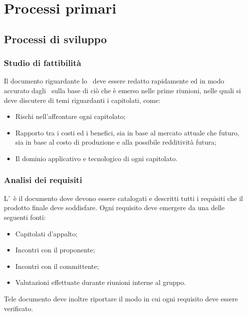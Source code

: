 \documentclass[../NormeProgetto.tex]{subfiles}
\begin{document}
\section{Processi primari}
	\subsection{Processi di sviluppo}
		\subsubsection{Studio di fattibilità}
		Il documento riguardante lo \studiodifattibilita\ deve essere redatto rapidamente ed in modo accurato dagli \analisti\ sulla base di ciò che è emerso nelle prime riunioni, nelle quali si deve discutere di temi riguardanti i capitolati, come:
		\begin{itemize}
			\item Rischi nell'affrontare ogni capitolato;
			\item Rapporto tra i costi ed i benefici, sia in base al mercato attuale che futuro, sia in base al costo di produzione e alla possibile redditività futura;
			\item Il dominio applicativo e tecnologico di ogni capitolato.
		\end{itemize}
		\subsubsection{Analisi dei requisiti}
		L'\analisideirequisiti\ è il documento dove devono essere catalogati e descritti tutti i requisiti che il prodotto finale deve soddisfare. Ogni requisito deve emergere da una delle seguenti fonti:
		\begin{itemize}
			\item Capitolati d'appalto;
			\item Incontri con il proponente;
			\item Incontri con il committente;
			\item Valutazioni effettuate durante riunioni interne al gruppo.
		\end{itemize}
		Tele documento deve inoltre riportare il modo in cui ogni requisito deve essere verificato.
\end{document}
